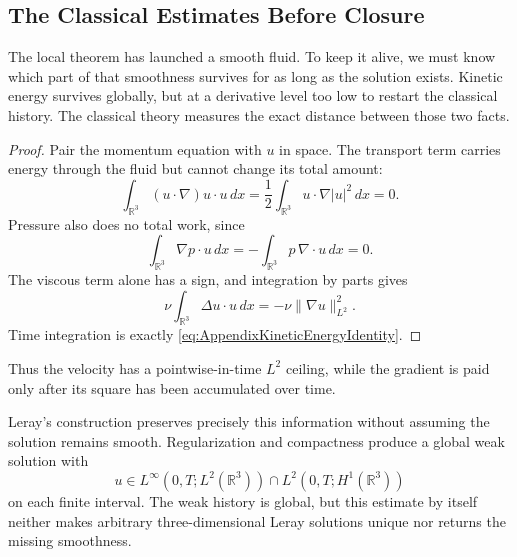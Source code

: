 \subsection{The Classical Estimates Before Closure}\label{sub:HistoricalEstimates}

The local theorem has launched a smooth fluid.  To keep it alive, we must know
which part of that smoothness survives for as long as the solution exists.
Kinetic energy survives globally, but at a derivative level too low to restart
the classical history.  The classical theory measures the exact distance
between those two facts.


\begin{proof}
Pair the momentum equation with \(u\) in space.  The transport term carries
energy through the fluid but cannot change its total amount:
\[
  \int_{\mathbb R^3}(u\cdot\nabla)u\cdot u\,dx
  =
  \frac12\int_{\mathbb R^3}u\cdot\nabla|u|^2\,dx
  =0.
\]
Pressure also does no total work, since
\[
  \int_{\mathbb R^3}\nabla p\cdot u\,dx
  =
  -\int_{\mathbb R^3}p\,\nabla\cdot u\,dx
  =0.
\]
The viscous term alone has a sign, and integration by parts gives
\[
  \nu\int_{\mathbb R^3}\Delta u\cdot u\,dx
  =
  -\nu\lVert\nabla u\rVert_{L^2}^2.
\]
Time integration is exactly \eqref{eq:AppendixKineticEnergyIdentity}.\qedhere
\end{proof}
Thus the velocity has a pointwise-in-time \(L^2\) ceiling, while the gradient is
paid only after its square has been accumulated over time.

Leray’s construction preserves precisely this information without assuming the
solution remains smooth.  Regularization and compactness produce a global weak
solution with \parencite{Leray1934}
\[
  u\in
  L^\infty(0,T;L^2(\mathbb R^3))
  \cap
  L^2(0,T;H^1(\mathbb R^3))
\]
on each finite interval.  The weak history is global, but this estimate by
itself neither makes arbitrary three-dimensional Leray solutions unique nor
returns the missing smoothness.


